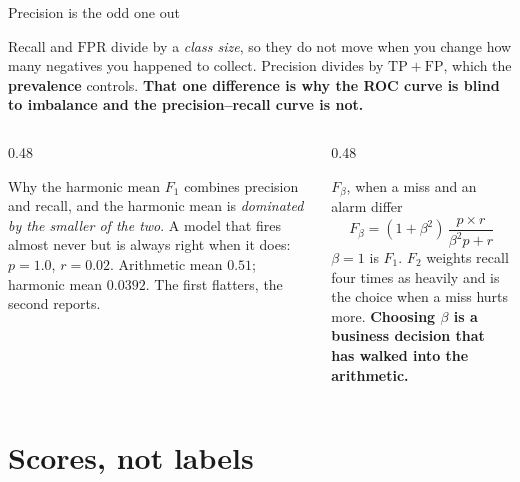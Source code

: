 \documentclass[aspectratio=169]{beamer}
\newcommand{\TP}{\mathrm{TP}}
\newcommand{\FP}{\mathrm{FP}}
\newcommand{\FPR}{\mathrm{FPR}}
\begin{document}
\begin{frame}[shrink=10]{Precision is the odd one out}
  \begin{exampleblock}{}
    \centering\small
    Recall and $\FPR$ divide by a \emph{class size}, so they do not move when
    you change how many negatives you happened to collect. Precision divides
    by $\TP + \FP$, which the \textbf{prevalence} controls. \textbf{That one
    difference is why the ROC curve is blind to imbalance and the
    precision--recall curve is not.}
  \end{exampleblock}
  \vspace{0.2em}
  \begin{columns}[T]
    \begin{column}{0.48\textwidth}
      \begin{block}{Why the harmonic mean}
        \small $F_1$ combines precision and recall, and the harmonic mean is
        \emph{dominated by the smaller of the two}. A model that fires almost
        never but is always right when it does: $p = 1.0$, $r = 0.02$.
        Arithmetic mean $0.51$; harmonic mean $\mathbf{0.0392}$. The first
        flatters, the second reports.
      \end{block}
    \end{column}
    \begin{column}{0.48\textwidth}
      \begin{alertblock}{$F_\beta$, when a miss and an alarm differ}
        \small
        \[
          F_\beta = (1 + \beta^2)\,
            \frac{p \times r}{\beta^2 p + r}
        \]
        $\beta = 1$ is $F_1$. $F_2$ weights recall four times as heavily and
        is the choice when a miss hurts more. \textbf{Choosing $\beta$ is a
        business decision that has walked into the arithmetic.}
      \end{alertblock}
    \end{column}
  \end{columns}
\end{frame}

\section[Scores]{Scores, not labels}
\label{sec:scores}
\end{document}
